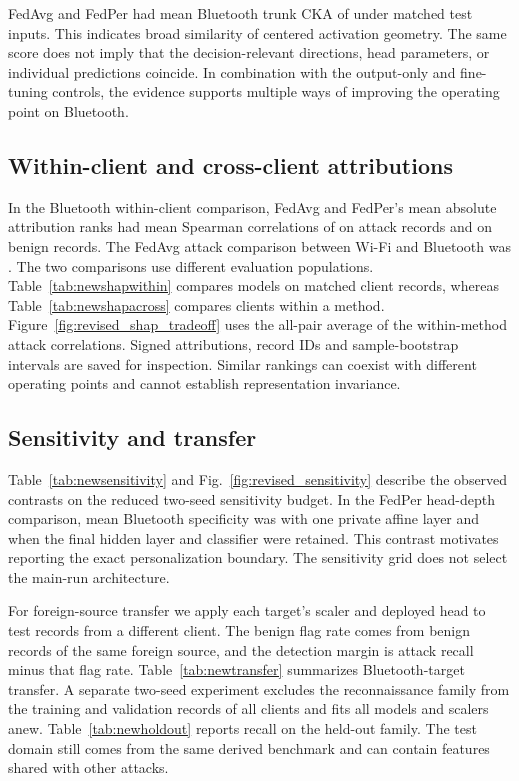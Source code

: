 \documentclass[nolineno]{ieeeaccess}
\begin{document}
FedAvg and FedPer had mean Bluetooth trunk CKA of \RevisionCka{} under matched test inputs. This indicates broad similarity of centered activation geometry. The same score does not imply that the decision-relevant directions, head parameters, or individual predictions coincide. In combination with the output-only and fine-tuning controls, the evidence supports multiple ways of improving the operating point on Bluetooth.

\RevisionDiagnostics

\subsection{Within-client and cross-client attributions}
In the Bluetooth within-client comparison, FedAvg and FedPer's mean absolute attribution ranks had mean Spearman correlations of \RevisionWithinAttack{} on attack records and \RevisionWithinBenign{} on benign records. The FedAvg attack comparison between Wi-Fi and Bluetooth was \RevisionAcrossAttack{}. The two comparisons use different evaluation populations. Table~\ref{tab:newshapwithin} compares models on matched client records, whereas Table~\ref{tab:newshapacross} compares clients within a method. Figure~\ref{fig:revised_shap_tradeoff} uses the all-pair average of the within-method attack correlations. Signed attributions, record IDs and sample-bootstrap intervals are saved for inspection. Similar rankings can coexist with different operating points and cannot establish representation invariance.

\RevisionShap

\subsection{Sensitivity and transfer}
Table~\ref{tab:newsensitivity} and Fig.~\ref{fig:revised_sensitivity} describe the observed contrasts on the reduced two-seed sensitivity budget. In the FedPer head-depth comparison, mean Bluetooth specificity was \RevisionHeadDepthOne{} with one private affine layer and \RevisionHeadDepthTwo{} when the final hidden layer and classifier were retained. This contrast motivates reporting the exact personalization boundary. The sensitivity grid does not select the main-run architecture.

For foreign-source transfer we apply each target's scaler and deployed head to test records from a different client. The benign flag rate comes from benign records of the same foreign source, and the detection margin is attack recall minus that flag rate. Table~\ref{tab:newtransfer} summarizes Bluetooth-target transfer. A separate two-seed experiment excludes the reconnaissance family from the training and validation records of all clients and fits all models and scalers anew. Table~\ref{tab:newholdout} reports recall on the held-out family. The test domain still comes from the same derived benchmark and can contain features shared with other attacks.
\end{document}
